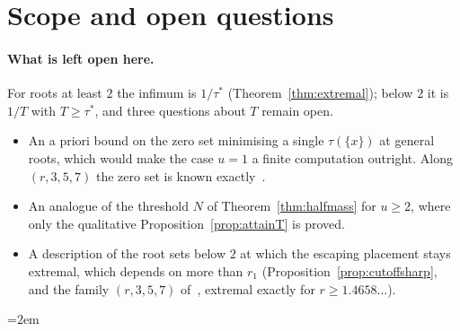 \documentclass[11pt]{article}
\theoremstyle{definition}
\theoremstyle{plain}
\begin{document}
\section{Scope and open questions}\label{sec:scope}

\paragraph{What is left open here.}  For roots at least $2$ the infimum is
$1/\tau^*$ (Theorem~\ref{thm:extremal}); below $2$ it is $1/T$ with
$T\ge\tau^*$, and three questions about $T$ remain open.
\begin{itemize}
\item An a priori bound on the zero set minimising a single $\tau(\{x\})$
at general roots, which would make the case $u=1$ a finite computation
outright.  Along $(r,3,5,7)$ the zero set is known
exactly~\cite{coefficient-mass-family}.
\item An analogue of the threshold $N$ of Theorem~\ref{thm:halfmass} for
$u\ge2$, where only the qualitative Proposition~\ref{prop:attainT} is
proved.
\item A description of the root sets below $2$ at which the escaping
placement stays extremal, which depends on more than $r_1$
(Proposition~\ref{prop:cutoffsharp}, and the family $(r,3,5,7)$
of~\cite{coefficient-mass-family}, extremal exactly for $r\ge1.4658\ldots$).
\end{itemize}

\begingroup
\emergencystretch=2em
\end{document}
